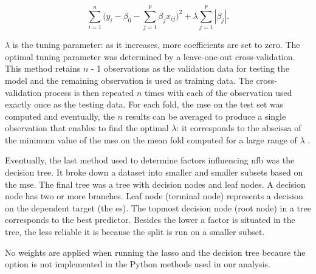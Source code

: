 \begin{equation}
\label{eq:factors_lasso-minimization}
\sum_{i=1}^{n} \Big(y_i - \beta_{0} - \sum_{j=1}^{p}\beta_{j}x_{ij}\Big)^2 + \lambda \sum_{j=1}^{p}|\beta_{j}| .
\end{equation} 

$\lambda$ is the tuning parameter: as it increases, more coefficients are set to zero. The optimal tuning parameter was determined 
by a leave-one-out cross-validation. This method retains $n$ - 1 observations as the validation data for testing the model and the 
remaining observation is used as training data. The cross-validation process is then repeated $n$ times with each of the observation 
used exactly once as the testing data. For each fold, the \gls{mse} on the test set was computed and eventually, the $n$ results can 
be averaged to produce a single observation that enables to find the optimal $\lambda$: it corresponds to the abscissa of the minimum
value of the \gls{mse} on the mean fold computed for a large range of $\lambda$ \citep{James2013}. 

Eventually, the last method used to determine factors influencing \gls{nfb} was the decision tree. It broke down a dataset into smaller
and smaller subsets based on the \gls{mse}. The final tree was a tree with decision nodes and leaf nodes. A decision node has two or 
more branches. Leaf node (terminal node) represents a decision on the dependent target (the \gls{es}). The topmost decision node (root node)
in a tree corresponds to the best predictor. Besides the lower a factor is situated in the tree, the less reliable it is because the split is
run on a smaller subset. 

No weights are applied when running the \gls{lasso} and the decision tree because the option is not implemented in the 
Python methods used in our analysis. 

















